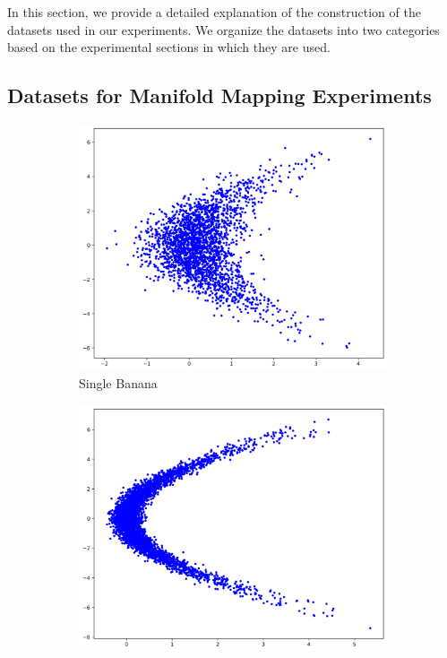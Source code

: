 In this section, we provide a detailed explanation of the construction of the datasets used in our experiments. We organize the datasets into two categories based on the experimental sections in which they are used.

\subsection{Datasets for Manifold Mapping Experiments}
\label{app:manifold_mapping}

\begin{figure}[ht]
\centering
\begin{subfigure}[b]{0.32\textwidth}
\includegraphics[width=\textwidth]{chapter5/results/visualisations/datasets/single_banana.png}
\caption{Single Banana}
\end{subfigure}
\begin{subfigure}[b]{0.32\textwidth}
\includegraphics[width=\textwidth]{chapter5/results/visualisations/datasets/squeezed_single_banana.png}

\end{subfigure}
\end{figure}
